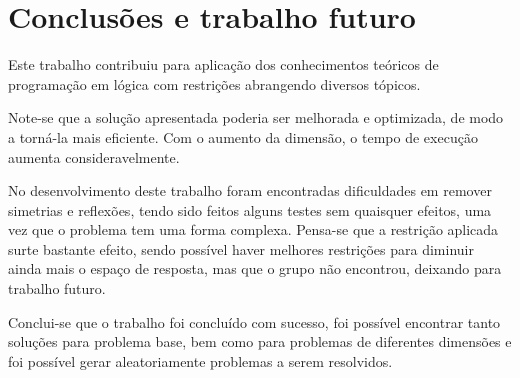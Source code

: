 \section{Conclusões e trabalho futuro}
Este trabalho contribuiu para aplicação dos conhecimentos teóricos de programação em lógica com restrições abrangendo diversos tópicos. 

Note-se que a solução apresentada poderia ser melhorada e optimizada, de modo a torná-la mais eficiente. Com o aumento da dimensão, o tempo de execução aumenta consideravelmente. 

No desenvolvimento deste trabalho foram encontradas dificuldades em remover simetrias e reflexões, tendo sido feitos alguns testes sem quaisquer efeitos, uma vez que o problema tem uma forma complexa. Pensa-se que a restrição aplicada surte bastante efeito, sendo possível haver melhores restrições para diminuir ainda mais o espaço de resposta, mas que o grupo não encontrou, deixando para trabalho futuro.


Conclui-se que o trabalho foi concluído com sucesso, foi possível encontrar tanto soluções para problema base, bem como para problemas de diferentes dimensões e foi possível gerar aleatoriamente problemas a serem resolvidos.
